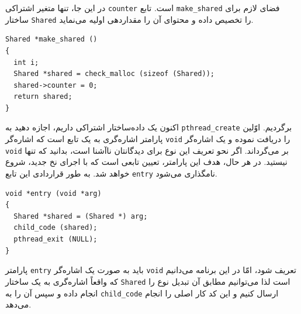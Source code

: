 \documentclass{book}
\begin{document}
    در این جا، تنها متغیر اشتراکی  {\tt counter}  است. تابع {\tt make\_shared}  فضای لازم برای ساختار  {\tt Shared} را تخصیص داده و 
    محتوای آن را مقداردهی اولیه می‌نماید. 

\begin{latin}
\begin{lstlisting}
Shared *make_shared ()
{
  int i;
  Shared *shared = check_malloc (sizeof (Shared));
  shared->counter = 0;
  return shared;
}
\end{lstlisting}
\end{latin}

    اکنون یک داده‌ساختار اشتراکی داریم، اجازه دهید  به {\tt pthread\_create} برگردیم. 
    اوّلین پارامتر اشاره‌گری به یک تابع است که اشاره‌گر {\tt void} را دریافت نموده و یک اشاره‌گر {\tt void} بر می‌گرداند. 
    اگر نحو تعریف این نوع برای دیدگانتان ناآشنا است، بدانید که تنها نیستید. 
    در هر حال، هدف این پارامتر، تعیین تابعی است که با اجرای نخ جدید، شروع خواهد شد. به طور قراردادی این تابع  {\tt entry} نامگذاری می‌شود. 

\begin{latin}
\begin{lstlisting}
void *entry (void *arg)
{
  Shared *shared = (Shared *) arg;
  child_code (shared);
  pthread_exit (NULL);
}
\end{lstlisting}
\end{latin}

    پارامتر {\tt entry}  باید به صورت یک اشاره‌گر  {\tt void} تعریف شود،‌ امّا در این برنامه می‌دانیم که واقعاً اشاره‌گری به یک ساختار {\tt Shared}  است 
    لذا می‌توانیم مطابق آن تبدیل نوع را انجام داده و سپس آن را به {\tt child\_code} ارسال کنیم و این کد کار اصلی را انجام می‌دهد. 
\end{document}

